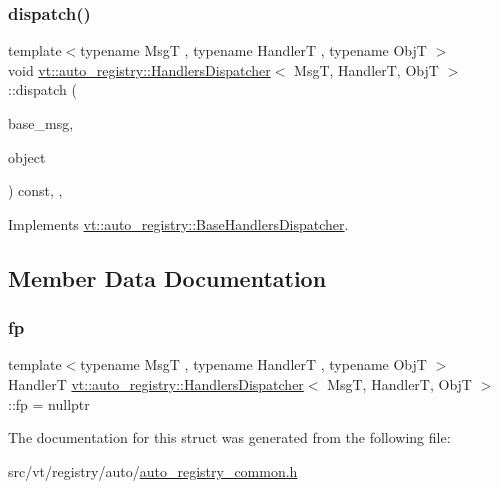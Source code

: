 \subsubsection{\texorpdfstring{dispatch()}{dispatch()}}
{\footnotesize\ttfamily template$<$typename MsgT , typename HandlerT , typename ObjT $>$ \\
void \hyperlink{structvt_1_1auto__registry_1_1_handlers_dispatcher}{vt\+::auto\+\_\+registry\+::\+Handlers\+Dispatcher}$<$ MsgT, HandlerT, ObjT $>$\+::dispatch (\begin{DoxyParamCaption}\item[{\hyperlink{structvt_1_1messaging_1_1_base_msg}{messaging\+::\+Base\+Msg} $\ast$}]{base\+\_\+msg,  }\item[{std\+::byte $\ast$}]{object }\end{DoxyParamCaption}) const\hspace{0.3cm}{\ttfamily [inline]}, {\ttfamily [override]}, {\ttfamily [virtual]}}



Implements \hyperlink{structvt_1_1auto__registry_1_1_base_handlers_dispatcher_af31a57d118de940836c3b8ea28b4a0d3}{vt\+::auto\+\_\+registry\+::\+Base\+Handlers\+Dispatcher}.



\subsection{Member Data Documentation}
\mbox{\label{structvt_1_1auto__registry_1_1_handlers_dispatcher_a2fe52dbcfedb744c43a0579de7c7167f}} 
\subsubsection{\texorpdfstring{fp}{fp}}
{\footnotesize\ttfamily template$<$typename MsgT , typename HandlerT , typename ObjT $>$ \\
HandlerT \hyperlink{structvt_1_1auto__registry_1_1_handlers_dispatcher}{vt\+::auto\+\_\+registry\+::\+Handlers\+Dispatcher}$<$ MsgT, HandlerT, ObjT $>$\+::fp = nullptr\hspace{0.3cm}{\ttfamily [private]}}



The documentation for this struct was generated from the following file\+:\begin{DoxyCompactItemize}
\item 
src/vt/registry/auto/\hyperlink{auto__registry__common_8h}{auto\+\_\+registry\+\_\+common.\+h}\end{DoxyCompactItemize}
